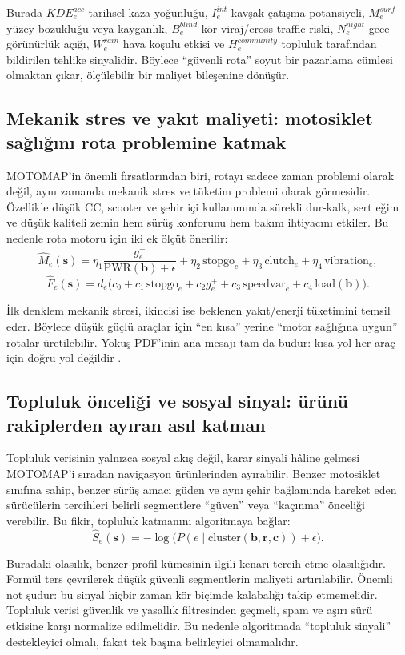 \documentclass[11pt,a4paper]{article}
\begin{document}
Burada $KDE^{acc}_e$ tarihsel kaza yoğunluğu, $I^{int}_e$ kavşak çatışma potansiyeli, $M^{surf}_e$ yüzey bozukluğu veya kayganlık, $B^{blind}_e$ kör viraj/cross-traffic riski, $N^{night}_e$ gece görünürlük açığı, $W^{rain}_e$ hava koşulu etkisi ve $H^{community}_e$ topluluk tarafından bildirilen tehlike sinyalidir. Böylece ``güvenli rota'' soyut bir pazarlama cümlesi olmaktan çıkar, ölçülebilir bir maliyet bileşenine dönüşür.

\subsection{Mekanik stres ve yakıt maliyeti: motosiklet sağlığını rota problemine katmak}

MOTOMAP'in önemli fırsatlarından biri, rotayı sadece zaman problemi olarak değil, aynı zamanda mekanik stres ve tüketim problemi olarak görmesidir. Özellikle düşük CC, scooter ve şehir içi kullanımında sürekli dur-kalk, sert eğim ve düşük kaliteli zemin hem sürüş konforunu hem bakım ihtiyacını etkiler. Bu nedenle rota motoru için iki ek ölçüt önerilir:
\[
\hat M_e(\mathbf{s}) = \eta_1\frac{g_e^+}{\text{PWR}(\mathbf{b})+\epsilon} + \eta_2\,\text{stopgo}_e + \eta_3\,\text{clutch}_e + \eta_4\,\text{vibration}_e,
\]
\[
\hat F_e(\mathbf{s}) = d_e\bigl(c_0 + c_1\,\text{stopgo}_e + c_2 g_e^+ + c_3\,\text{speedvar}_e + c_4\,\text{load}(\mathbf{b})\bigr).
\]

İlk denklem mekanik stresi, ikincisi ise beklenen yakıt/enerji tüketimini temsil eder. Böylece düşük güçlü araçlar için ``en kısa'' yerine ``motor sağlığına uygun'' rotalar üretilebilir. Yokuş PDF'inin ana mesajı tam da budur: kısa yol her araç için doğru yol değildir \cite{u2}.

\subsection{Topluluk önceliği ve sosyal sinyal: ürünü rakiplerden ayıran asıl katman}

Topluluk verisinin yalnızca sosyal akış değil, karar sinyali hâline gelmesi MOTOMAP'i sıradan navigasyon ürünlerinden ayırabilir. Benzer motosiklet sınıfına sahip, benzer sürüş amacı güden ve aynı şehir bağlamında hareket eden sürücülerin tercihleri belirli segmentlere ``güven'' veya ``kaçınma'' önceliği verebilir. Bu fikir, topluluk katmanını algoritmaya bağlar:
\[
\hat S_e(\mathbf{s}) = -\log\bigl(P(e\mid \text{cluster}(\mathbf{b},\mathbf{r},\mathbf{c})) + \epsilon\bigr).
\]

Buradaki olasılık, benzer profil kümesinin ilgili kenarı tercih etme olasılığıdır. Formül ters çevrilerek düşük güvenli segmentlerin maliyeti artırılabilir. Önemli not şudur: bu sinyal hiçbir zaman kör biçimde kalabalığı takip etmemelidir. Topluluk verisi güvenlik ve yasallık filtresinden geçmeli, spam ve aşırı sürü etkisine karşı normalize edilmelidir. Bu nedenle algoritmada ``topluluk sinyali'' destekleyici olmalı, fakat tek başına belirleyici olmamalıdır.
\end{document}
